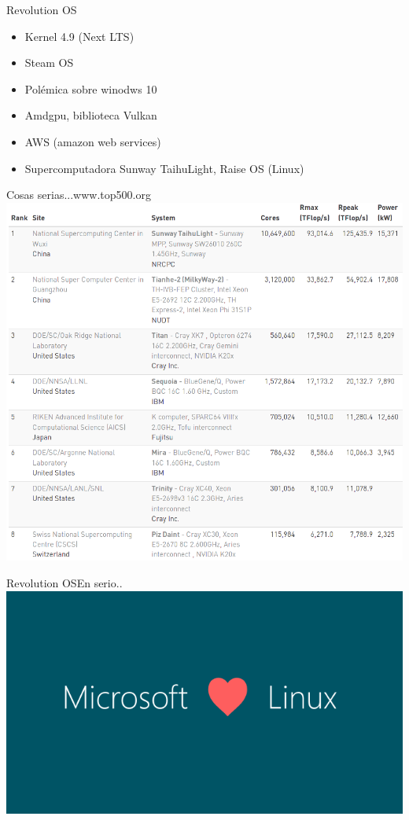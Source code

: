 \documentclass{beamer}
\begin{document}
\begin {frame}{Revolution OS}
\begin {itemize}
\item Kernel 4.9 (Next LTS)
\item Steam OS 
\item Polémica sobre winodws 10
\item Amdgpu, biblioteca Vulkan 
\item AWS (amazon web services)
\item Supercomputadora Sunway TaihuLight, Raise OS (Linux)

\end{itemize}
\end {frame}
\begin {frame}{Cosas serias...}{www.top500.org}
\includegraphics[width=\textwidth]{top.png}
\end {frame}

\begin{frame}{Revolution OS}{En serio..}
\includegraphics[width=\textwidth]{micro.png}
\end {frame}
\end{document}
